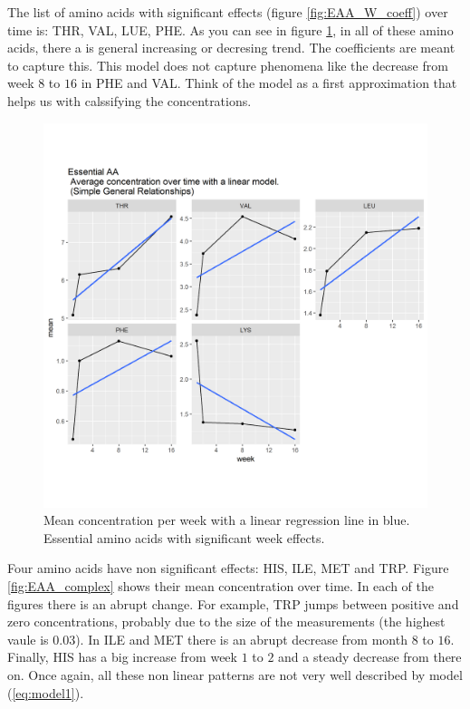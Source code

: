 \documentclass[12pt]{article}
\begin{document}
The list of amino acids with significant effects (figure \ref{fig:EAA_W_coeff}) over time is: THR, VAL, LUE, PHE. As you can see in figure \ref{fig:EAA_simple}, in all of these amino acids, there a is general increasing or decresing trend. The coefficients are meant to capture this. This model does not capture phenomena like the decrease from week $8$ to $16$ in PHE and VAL. Think of the model as a first approximation that helps us with calssifying the concentrations.

\begin{figure}[!htb]
  \centering
  \includegraphics[width=\textwidth]{../week/EAA_simple.png}
  \caption{Mean concentration per week with a linear regression line in blue. Essential amino acids with significant week effects.}
  \label{fig:EAA_simple}
\end{figure}


Four amino acids have non significant effects: HIS, ILE, MET and TRP. Figure \ref{fig:EAA_complex} shows their mean concentration over time. In each of the figures there is an abrupt change. For example, TRP jumps between positive and zero concentrations, probably due to the size of the measurements (the highest vaule is $0.03$). In ILE and MET there is an abrupt decrease from month $8$ to $16$. Finally, HIS has a big increase from week $1$ to $2$ and a steady decrease from there on. Once again, all these non linear patterns are not very well described by model (\ref{eq:model1}).
\end{document}
